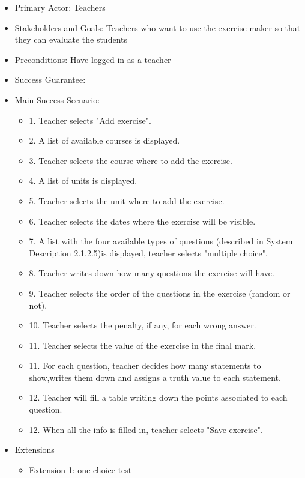 \documentclass{article}
\begin{document}
\begin{enumerate}
\begin{enumerate}
\begin{enumerate}
\begin{itemize}
			\begin{itemize}
				\item Primary Actor: Teachers
				\item Stakeholders and Goals: Teachers who want to use the exercise maker so that they can evaluate the students
				\item Preconditions: Have logged in as a teacher
				\item Success Guarantee:
				\item Main Success Scenario:
				\begin{itemize}
					\item 1. Teacher selects "Add exercise".
					\item 2. A list of available courses is displayed.
					\item 3. Teacher selects the course where to add the exercise.
					\item 4. A list of units is displayed.
					\item 5. Teacher selects the unit where to add the exercise.
					\item 6. Teacher selects the dates where the exercise will be visible.
					\item 7. A list with the four available types of questions (described in System Description 2.1.2.5)is displayed, teacher selects "multiple choice".
					\item 8. Teacher writes down how many questions the exercise will have.
					\item 9. Teacher selects the order of the questions in the exercise (random or not).
					\item 10. Teacher selects the penalty, if any, for each wrong answer.
					\item 11. Teacher selects the value of the exercise in the final mark.
					\item 11. For each question, teacher decides how many statements to show,writes them down and assigns a truth value to each statement.
					\item 12. Teacher will fill a table writing down the points associated to each question.
					\item 12. When all the info is filled in, teacher selects "Save exercise". 
				\end{itemize}
				\item{Extensions}
				\begin{itemize}
					\item Extension 1: one choice test
					\begin{itemize}

\end{itemize}
\end{itemize}
\end{itemize}
\end{itemize}
\end{enumerate}
\end{enumerate}
\end{enumerate}
\end{document}
